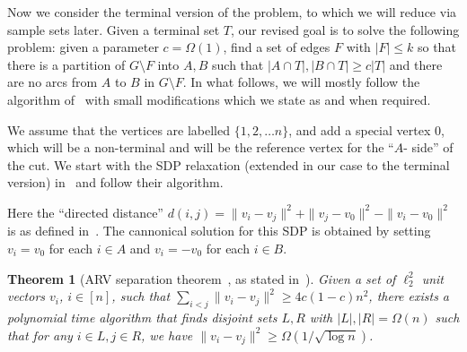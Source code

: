 \documentclass[11pt]{article}
\newtheorem{theorem}{Theorem}[section]
\begin{document}
{Now we consider the terminal version of the problem, to which we will reduce via sample sets later. Given a terminal set $T$, our revised goal is to solve the following problem: given a parameter $c = \Omega(1)$, find a set of edges $F$ with $|F| \leq k$ so that there is a partition of $G \setminus F$ into $A, B$ such that $|A \cap T|, |B \cap T| \geq c|T|$ and there are no arcs from $A$ to $B$ in $G \setminus F$. In what follows, we will mostly follow the algorithm of~\cite{agarwal2005log} with small modifications which we state as and when required. 




We assume that the vertices are labelled $\{1,2, \ldots n\}$, and add a special vertex $0$, which will be a non-terminal and will be the reference vertex for the 
``$A$- side'' of the cut. We start with the SDP relaxation (extended in our case to the terminal version) in~\cite{agarwal2005log} and follow their algorithm.

\begin{center}
\noindent{}
\end{center}
Here the ``directed distance'' $d(i,j) = \|v_i - v_j\|^2 +\|v_j - v_0\|^2 - \|v_i - v_0\|^2$ is as defined in~\cite{agarwal2005log}. The cannonical solution for this SDP is obtained by setting $v_i = v_0$ for each $i \in A$ and $v_i = -v_0$ for each $i \in B$.

\begin{theorem}[ARV separation theorem~\cite{arora2009expander}, as stated in~\cite{agarwal2005log}] Given a set of $\ell_2^2$ unit vectors $v_i$, $i \in [n]$, such that $\sum_{i < j} \|v_i -v_j\|^2 \geq 4c(1-c)n^2$, there exists a polynomial time algorithm that finds disjoint sets $L,R$ with $|L|, |R| = \Omega(n)$ such that for any $i \in L, j \in R$, we have $\|v_i - v_j\|^2 \geq \Omega({1}/{\sqrt{\log n}})$.
\label{thm:structure}


\end{theorem}



}
\end{document}
